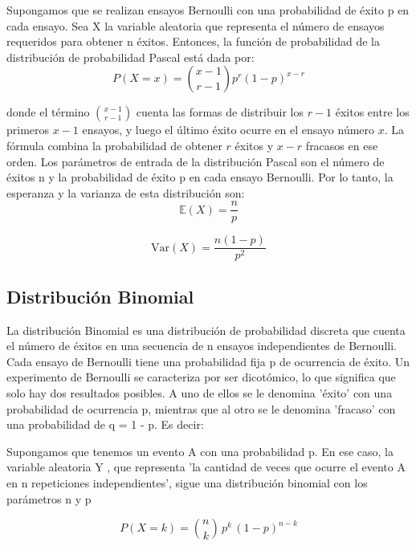 \documentclass{article}
\begin{document}
 Supongamos que se realizan ensayos Bernoulli con una probabilidad de éxito p en cada ensayo. Sea X la variable aleatoria que representa el número de ensayos requeridos para obtener n éxitos. Entonces, la función de probabilidad de la distribución de probabilidad Pascal está dada por:
\begin{equation}
    P(X = x) = \binom{x - 1}{r - 1} p^r (1 - p)^{x - r}
\end{equation}

donde el término $\binom{x - 1}{r - 1}$ cuenta las formas de distribuir los $r - 1$ éxitos entre los primeros $x - 1$ ensayos, y luego el último éxito ocurre en el ensayo número $x$. La fórmula combina la probabilidad de obtener $r$ éxitos y $x - r$ fracasos en ese orden.
Los parámetros de entrada de la distribución Pascal son el número de éxitos n y la probabilidad de éxito p en cada ensayo Bernoulli. Por lo tanto, la esperanza y la varianza de esta distribución son:
\begin{equation}
    \mathbb{E}(X) = \frac{n}{p}
\end{equation}

\begin{equation}
    \mathrm{Var}(X) = \frac{n(1 - p)}{p^2}
\end{equation}

\subsection{Distribución Binomial}
La distribución Binomial es una distribución de probabilidad discreta que cuenta el número de éxitos en una secuencia de n ensayos independientes de Bernoulli. Cada ensayo de Bernoulli tiene una probabilidad fija p de ocurrencia de éxito. Un experimento de Bernoulli se caracteriza por ser dicotómico, lo que significa que solo hay dos resultados posibles. A uno de ellos se le denomina ’éxito’ con una probabilidad de ocurrencia p, mientras que al otro se le denomina ’fracaso’ con una probabilidad de q = 1 - p. Es decir:

Supongamos que tenemos un evento A con una probabilidad p. En ese caso, la variable aleatoria Y , que representa ’la cantidad de veces que ocurre el evento A en n repeticiones independientes’, sigue una distribución binomial con los parámetros n y p

\begin{equation}
    P(X = k) = \binom{n}{k} \, p^k \, (1 - p)^{n - k}
\end{equation}
\end{document}
